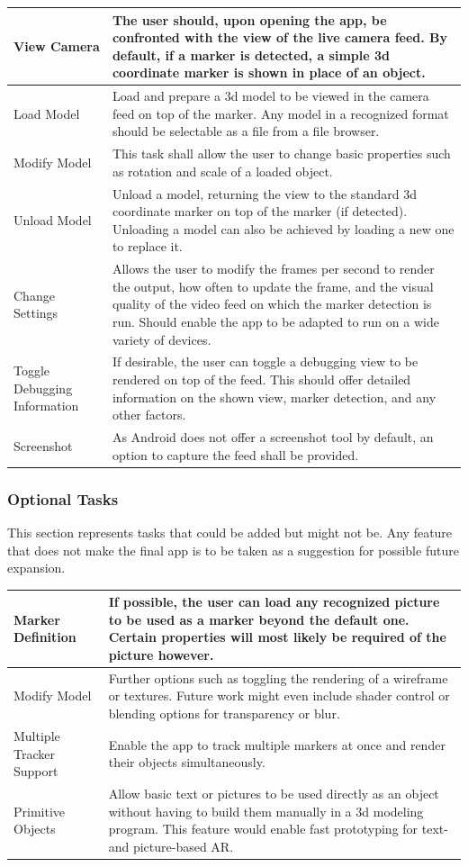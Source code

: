 \begin{tabulary}{\textwidth}{L || L}
View Camera & The user should, upon opening the app, be confronted with the view of the live camera feed. By default, if a marker is detected, a simple 3d coordinate marker is shown in place of an object. \\
\hline
Load Model & Load and prepare a 3d model to be viewed in the camera feed on top of the marker. Any model in a recognized format should be selectable as a file from a file browser. \\
\hline
Modify Model & This task shall allow the user to change basic properties such as rotation and scale of a loaded object.\\
\hline
Unload Model & Unload a model, returning the view to the standard 3d coordinate marker on top of the marker (if detected). Unloading a model can also be achieved by loading a new one to replace it. \\
\hline
Change Settings & Allows the user to modify the frames per second to render the output, how often to update the frame, and the visual quality of the video feed on which the marker detection is run. Should enable the app to be adapted to run on a wide variety of devices.\\
\hline
Toggle Debugging Information & If desirable, the user can toggle a debugging view to be rendered on top of the feed. This should offer detailed information on the shown view, marker detection, and any other factors. \\
\hline
Screenshot & As Android does not offer a screenshot tool by default, an option to capture the feed shall be provided. \\
\end{tabulary}

\subsubsection*{Optional Tasks}

This section represents tasks that could be added but might not be.
Any feature that does not make the final app is to be taken as a suggestion for possible future expansion.

\begin{tabulary}{\textwidth}{L || L}
Marker Definition & If possible, the user can load any recognized picture to be used as a marker beyond the default one. Certain properties will most likely be required of the picture however. \\
\hline
Modify Model & Further options such as toggling the rendering of a wireframe or textures. Future work might even include shader control or blending options for transparency or blur.\\
\hline
Multiple Tracker Support & Enable the app to track multiple markers at once and render their objects simultaneously.\\
\hline
Primitive Objects & Allow basic text or pictures to be used directly as an object without having to build them manually in a 3d modeling program. This feature would enable fast prototyping for text- and picture-based AR.\\
\end{tabulary}

